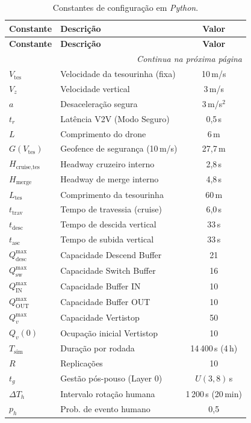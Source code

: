 \documentclass[12pt,a4paper]{article}
\newcommand{\vtes}{V_{\text{tes}}}
\newcommand{\vz}{V_z}
\begin{document}
\begin{longtable}{@{}llc@{}}
\caption{Constantes de configuração em \textit{Python}.} \label{tab:constantes} \\
\toprule
\textbf{Constante} & \textbf{Descrição} & \textbf{Valor} \\
\midrule
\endfirsthead
\toprule
\textbf{Constante} & \textbf{Descrição} & \textbf{Valor} \\
\midrule
\endhead
\midrule
\multicolumn{3}{r}{\footnotesize \textit{Continua na próxima página}} \\
\endfoot
\bottomrule
\endlastfoot
$\vtes$                   & Velocidade da tesourinha (fixa) & 10\,m/s \\
$\vz$                     & Velocidade vertical            & 3\,m/s \\
$a$                       & Desaceleração segura           & 3\,m/s$^2$ \\
$t_{r}$                   & Latência V2V (Modo Seguro)     & 0{,}5\,s \\
$L$                       & Comprimento do drone           & 6\,m \\
\midrule
$G(\vtes)$                & Geofence de segurança (10\,m/s) & 27{,}7\,m \\
$H_{\text{cruise,tes}}$   & Headway cruzeiro interno       & 2{,}8\,s \\
$H_{\text{merge}}$        & Headway de merge interno       & 4{,}8\,s \\
\midrule
$L_{\text{tes}}$          & Comprimento da tesourinha       & 60\,m \\
$t_{\text{trav}}$         & Tempo de travessia (cruise)     & 6{,}0\,s \\
$t_{\text{desc}}$         & Tempo de descida vertical       & 33\,s \\
$t_{\text{asc}}$          & Tempo de subida vertical        & 33\,s \\
\midrule
$Q_{\text{desc}}^{\max}$    & Capacidade Descend Buffer    & 21 \\
$Q_{\text{sw}}^{\max}$      & Capacidade Switch Buffer     & 16 \\
$Q_{\text{IN}}^{\max}$      & Capacidade Buffer IN         & 10 \\
$Q_{\text{OUT}}^{\max}$     & Capacidade Buffer OUT        & 10 \\
$Q_v^{\max}$              & Capacidade Vertistop           & 50 \\
$Q_v(0)$                  & Ocupação inicial Vertistop     & 10 \\
\midrule
$T_{\text{sim}}$          & Duração por rodada              & 14\,400\,s (4\,h) \\
$R$                       & Replicações                     & 10 \\
$t_g$                     & Gestão pós-pouso (Layer 0)      & $U(3, 8)$\,s \\
$\Delta T_h$              & Intervalo rotação humana        & 1\,200\,s (20\,min) \\
$p_h$                     & Prob. de evento humano          & 0{,}5 \\
\end{longtable}
\end{document}
